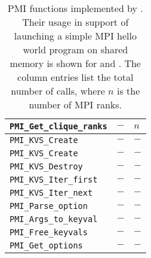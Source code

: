 \begin{table}
\begin{tabular}{|p{8cm}|p{3.5cm}|p{3cm}|}
\hline
{\tt  PMI\_Get\_clique\_ranks} & $-$ & $n$ \\
\hline
{\tt  PMI\_KVS\_Create} & $-$ & $-$ \\
\hline
{\tt  PMI\_KVS\_Create} & $-$ & $-$ \\
\hline
{\tt  PMI\_KVS\_Destroy} & $-$ & $-$ \\
\hline
{\tt  PMI\_KVS\_Iter\_first} & $-$ & $-$ \\
\hline
{\tt  PMI\_KVS\_Iter\_next} & $-$ & $-$ \\
\hline
{\tt  PMI\_Parse\_option} & $-$ & $-$ \\
\hline
{\tt  PMI\_Args\_to\_keyval} & $-$ & $-$ \\
\hline
{\tt  PMI\_Free\_keyvals} & $-$ & $-$ \\
\hline
{\tt  PMI\_Get\_options} & $-$ & $-$ \\
\hline
\end{tabular}
\caption{PMI functions implemented by \slurm.
Their usage in support of launching a simple MPI hello world program
on shared memory is shown for  and \openmpi.
The column entries list the total number of calls, where $n$ is the
number of MPI ranks.}
\label{tab:pmiv1}
\end{table}

